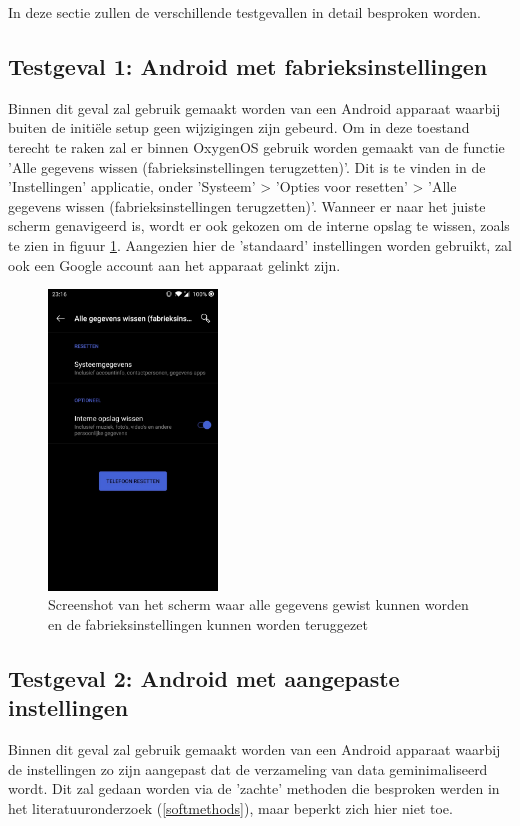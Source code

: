 In deze sectie zullen de verschillende testgevallen in detail besproken worden.

\subsection{Testgeval 1: Android met fabrieksinstellingen}
\label{sec:testgeval1}
Binnen dit geval zal gebruik gemaakt worden van een Android apparaat waarbij buiten de initiële setup geen wijzigingen zijn gebeurd. Om in deze toestand terecht te raken zal er binnen OxygenOS gebruik worden gemaakt van de functie 'Alle gegevens wissen (fabrieksinstellingen terugzetten)'. Dit is te vinden in de 'Instellingen' applicatie, onder 'Systeem' >  'Opties voor resetten' > 'Alle gegevens wissen (fabrieksinstellingen terugzetten)'. Wanneer er naar het juiste scherm genavigeerd is, wordt er ook gekozen om de interne opslag te wissen, zoals te zien in figuur \ref{fig:fabrieksinstellingen}. Aangezien hier de 'standaard' instellingen worden gebruikt, zal ook een Google account aan het apparaat gelinkt zijn.

\begin{figure}
    \centering
    \includegraphics[width=0.4\textwidth]{img/fabrieksinstellingen.jpg}
    \caption{Screenshot van het scherm waar alle gegevens gewist kunnen worden en de fabrieksinstellingen kunnen worden teruggezet}
    \label{fig:fabrieksinstellingen}
\end{figure}


\subsection{Testgeval 2: Android met aangepaste instellingen}
\label{sec:testgeval2}
Binnen dit geval zal gebruik gemaakt worden van een Android apparaat waarbij de instellingen zo zijn aangepast dat de verzameling van data geminimaliseerd wordt. Dit zal gedaan worden via de 'zachte' methoden die besproken werden in het literatuuronderzoek (\ref{softmethods}), maar beperkt zich hier niet toe.

